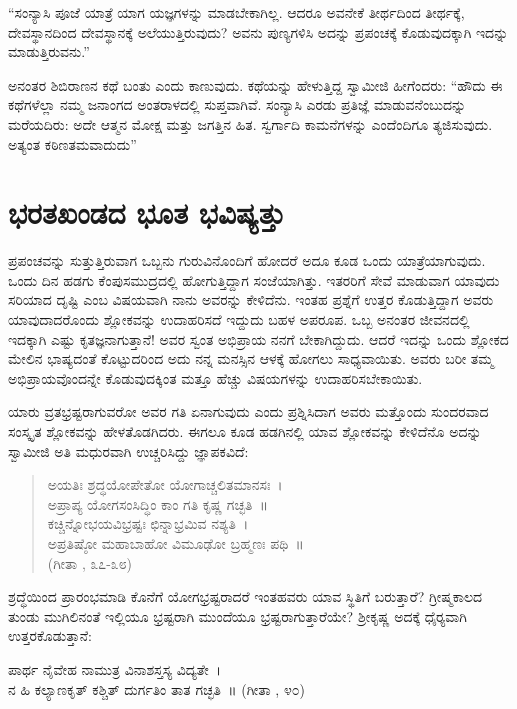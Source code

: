 \newpage

 “ಸಂನ್ಯಾಸಿ ಪೂಜೆ ಯಾತ್ರೆ ಯಾಗ ಯಜ್ಞಗಳನ್ನು ಮಾಡಬೇಕಾಗಿಲ್ಲ. ಆದರೂ ಅವನೇಕೆ ತೀರ್ಥದಿಂದ ತೀರ್ಥಕ್ಕೆ, ದೇವಸ್ಥಾನದಿಂದ ದೇವಸ್ಥಾನಕ್ಕೆ ಅಲೆಯುತ್ತಿರುವುದು? ಅವನು ಪುಣ್ಯಗಳಿಸಿ ಅದನ್ನು ಪ್ರಪಂಚಕ್ಕೆ ಕೊಡುವುದಕ್ಕಾಗಿ ಇದನ್ನು ಮಾಡುತ್ತಿರುವನು.” 

 ಅನಂತರ ಶಿಬಿರಾಣನ ಕಥೆ ಬಂತು ಎಂದು ಕಾಣುವುದು. ಕಥೆಯನ್ನು ಹೇಳುತ್ತಿದ್ದ ಸ್ವಾಮೀಜಿ ಹೀಗೆಂದರು: “ಹೌದು ಈ ಕಥೆಗಳೆಲ್ಲಾ ನಮ್ಮ ಜನಾಂಗದ ಅಂತರಾಳದಲ್ಲಿ ಸುಪ್ತವಾಗಿವೆ. ಸಂನ್ಯಾಸಿ ಎರಡು ಪ್ರತಿಜ್ಞೆ ಮಾಡುವನೆಂಬುದನ್ನು ಮರೆಯದಿರು: ಅದೇ ಆತ್ಮನ ಮೋಕ್ಷ ಮತ್ತು ಜಗತ್ತಿನ ಹಿತ. ಸ್ವರ್ಗಾದಿ ಕಾಮನೆಗಳನ್ನು ಎಂದೆಂದಿಗೂ ತ್ಯಜಿಸುವುದು. ಅತ್ಯಂತ ಕಠಿಣತಮವಾದುದು”


\section*{ಭರತಖಂಡದ ಭೂತ ಭವಿಷ್ಯತ್ತು}

 ಪ್ರಪಂಚವನ್ನು ಸುತ್ತುತ್ತಿರುವಾಗ ಒಬ್ಬನು ಗುರುವಿನೊಂದಿಗೆ ಹೋದರೆ ಅದೂ ಕೂಡ ಒಂದು ಯಾತ್ರೆಯಾಗುವುದು. ಒಂದು ದಿನ ಹಡಗು ಕೆಂಪುಸಮುದ್ರದಲ್ಲಿ ಹೋಗುತ್ತಿದ್ದಾಗ ಸಂಜೆಯಾಗಿತ್ತು. ಇತರರಿಗೆ ಸೇವೆ ಮಾಡುವಾಗ ಯಾವುದು ಸರಿಯಾದ ದೃಷ್ಟಿ ಎಂಬ ವಿಷಯವಾಗಿ ನಾನು ಅವರನ್ನು ಕೇಳಿದೆನು. ಇಂತಹ ಪ್ರಶ್ನೆಗೆ ಉತ್ತರ ಕೊಡುತ್ತಿದ್ದಾಗ ಅವರು ಯಾವುದಾದರೊಂದು ಶ್ಲೋಕವನ್ನು ಉದಾಹರಿಸದೆ ಇದ್ದುದು ಬಹಳ ಅಪರೂಪ. ಒಬ್ಬ ಅನಂತರ ಜೀವನದಲ್ಲಿ ಇದಕ್ಕಾಗಿ ಎಷ್ಟು ಕೃತಜ್ಞನಾಗುತ್ತಾನೆ! ಅವರ ಸ್ವಂತ ಅಭಿಪ್ರಾಯ ನನಗೆ ಬೇಕಾಗಿದ್ದುದು. ಆದರೆ ಇದನ್ನು ಒಂದು ಶ್ಲೋಕದ ಮೇಲಿನ ಭಾಷ್ಯದಂತೆ ಕೊಟ್ಟುದರಿಂದ ಅದು ನನ್ನ ಮನಸ್ಸಿನ ಆಳಕ್ಕೆ ಹೋಗಲು ಸಾಧ್ಯವಾಯಿತು. ಅವರು ಬರೀ ತಮ್ಮ ಅಭಿಪ್ರಾಯವೊಂದನ್ನೇ ಕೊಡುವುದಕ್ಕಿಂತ ಮತ್ತೂ ಹೆಚ್ಚು ವಿಷಯಗಳನ್ನು ಉದಾಹರಿಸಬೇಕಾಯಿತು. 

 ಯಾರು ವ್ರತಭ್ರಷ್ಟರಾಗುವರೋ ಅವರ ಗತಿ ಏನಾಗುವುದು ಎಂದು ಪ್ರಶ್ನಿಸಿದಾಗ ಅವರು ಮತ್ತೊಂದು ಸುಂದರವಾದ ಸಂಸ್ಕೃತ ಶ್ಲೋಕವನ್ನು ಹೇಳತೊಡಗಿದರು. ಈಗಲೂ ಕೂಡ ಹಡಗಿನಲ್ಲಿ ಯಾವ ಶ್ಲೋಕವನ್ನು ಕೇಳಿದೆನೊ ಅದನ್ನು ಸ್ವಾಮೀಜಿ ಅತಿ ಮಧುರವಾಗಿ ಉಚ್ಚರಿಸಿದ್ದು ಜ್ಞಾಪಕವಿದೆ:

\begin{verse}
ಅಯತಿಃ ಶ್ರದ್ಧಯೋಪೇತೋ ಯೋಗಾಚ್ಚಲಿತಮಾನಸಃ~।\\ಅಪ್ರಾಪ್ಯ ಯೋಗಸಂಸಿದ್ಧಿಂ ಕಾಂ ಗತಿ ಕೃಷ್ಣ ಗಚ್ಛತಿ~॥\\ಕಚ್ಚಿನ್ನೋಭಯವಿಭ್ರಷ್ಟಃ ಛಿನ್ನಾಭ್ರಮಿವ ನಶ್ಯತಿ~।\\ಅಪ್ರತಿಷ್ಠೋ ಮಹಾಬಾಹೋ ವಿಮೂಢೋ ಬ್ರಹ್ಮಣಃ ಪಥಿ~॥\\ (ಗೀತಾ , ೩೭-೩೮)
\end{verse}

 ಶ್ರದ್ಧೆಯಿಂದ ಪ್ರಾರಂಭಮಾಡಿ ಕೊನೆಗೆ ಯೋಗಭ್ರಷ್ಟರಾದರೆ ಇಂತಹವರು ಯಾವ ಸ್ಥಿತಿಗೆ ಬರುತ್ತಾರೆ? ಗ್ರೀಷ್ಮಕಾಲದ ತುಂಡು ಮುಗಿಲಿನಂತೆ ಇಲ್ಲಿಯೂ ಭ್ರಷ್ಟರಾಗಿ ಮುಂದೆಯೂ ಭ್ರಷ್ಟರಾಗುತ್ತಾರೆಯೇ? ಶ‍್ರೀಕೃಷ್ಣ ಅದಕ್ಕೆ ಧೈರ‍್ಯವಾಗಿ ಉತ್ತರಕೊಡುತ್ತಾನೆ: 

ಪಾರ್ಥ ನೈವೇಹ ನಾಮುತ್ರ ವಿನಾಶಸ್ತಸ್ಯ ವಿದ್ಯತೇ~। \\ನ ಹಿ ಕಲ್ಯಾಣಕೃತ್ ಕಶ್ಚಿತ್ ದುರ್ಗತಿಂ ತಾತ ಗಚ್ಛತಿ~॥ (ಗೀತಾ , ೪೦)

